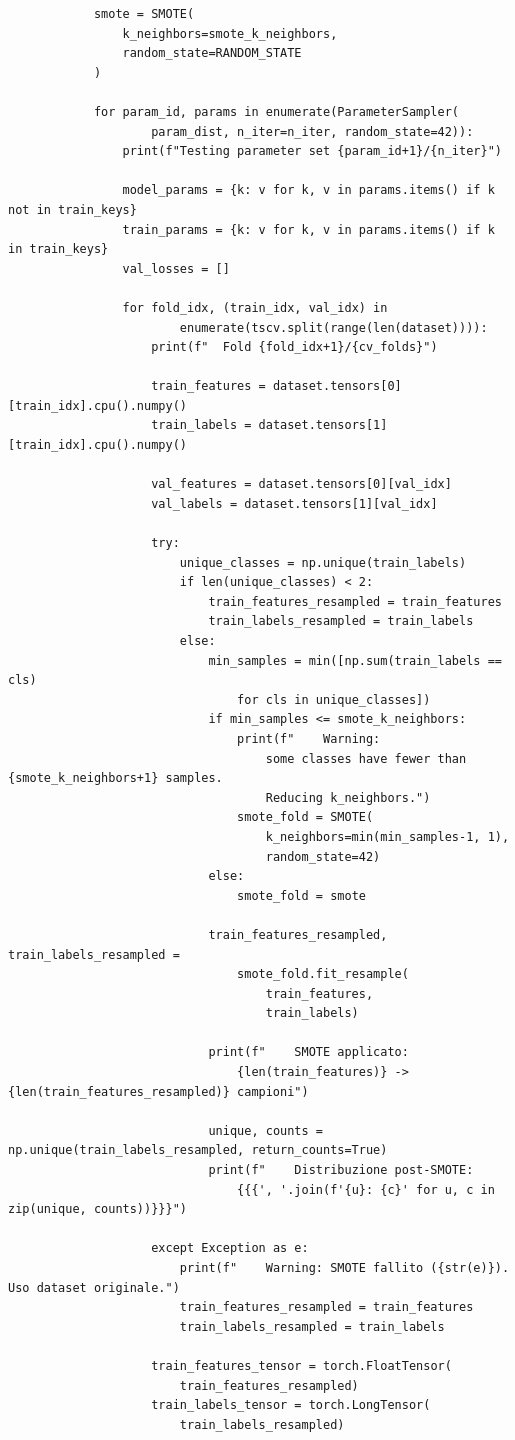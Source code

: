 \documentclass[a4paper,12pt]{report}
\begin{document}
\begin{verbatim}
			smote = SMOTE(
				k_neighbors=smote_k_neighbors,
				random_state=RANDOM_STATE
			)
			
			for param_id, params in enumerate(ParameterSampler(
					param_dist, n_iter=n_iter, random_state=42)):
				print(f"Testing parameter set {param_id+1}/{n_iter}")
			
				model_params = {k: v for k, v in params.items() if k not in train_keys}
				train_params = {k: v for k, v in params.items() if k in train_keys}
				val_losses = []
				
				for fold_idx, (train_idx, val_idx) in 
						enumerate(tscv.split(range(len(dataset)))):
					print(f"  Fold {fold_idx+1}/{cv_folds}")
					
					train_features = dataset.tensors[0][train_idx].cpu().numpy()
					train_labels = dataset.tensors[1][train_idx].cpu().numpy()
					
					val_features = dataset.tensors[0][val_idx]
					val_labels = dataset.tensors[1][val_idx]
					
					try:
						unique_classes = np.unique(train_labels)
						if len(unique_classes) < 2:
							train_features_resampled = train_features
							train_labels_resampled = train_labels
						else:
							min_samples = min([np.sum(train_labels == cls) 
								for cls in unique_classes])
							if min_samples <= smote_k_neighbors:
								print(f"    Warning: 
									some classes have fewer than {smote_k_neighbors+1} samples. 
									Reducing k_neighbors.")
								smote_fold = SMOTE(
									k_neighbors=min(min_samples-1, 1), 
									random_state=42)
							else:
								smote_fold = smote
						
							train_features_resampled, train_labels_resampled = 
								smote_fold.fit_resample(
									train_features, 
									train_labels)
							
							print(f"    SMOTE applicato: 
								{len(train_features)} -> {len(train_features_resampled)} campioni")
							
							unique, counts = np.unique(train_labels_resampled, return_counts=True)
							print(f"    Distribuzione post-SMOTE: 
								{{{', '.join(f'{u}: {c}' for u, c in zip(unique, counts))}}}")
					
					except Exception as e:
						print(f"    Warning: SMOTE fallito ({str(e)}). Uso dataset originale.")
						train_features_resampled = train_features
						train_labels_resampled = train_labels
					
					train_features_tensor = torch.FloatTensor(
						train_features_resampled)
					train_labels_tensor = torch.LongTensor(
						train_labels_resampled)
					

\end{verbatim}
\end{document}
